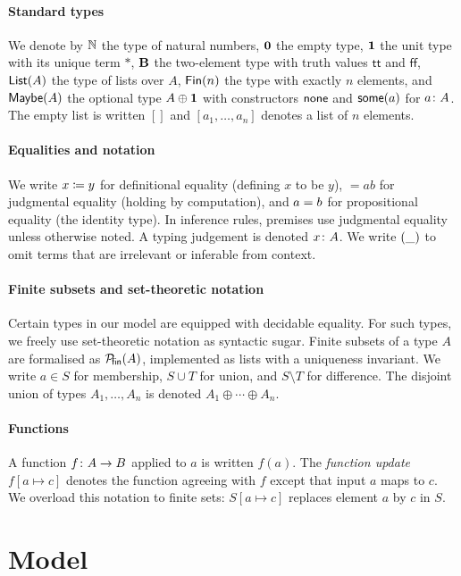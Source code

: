 \documentclass[
  a4paper,        %
  techreport,     %
]{art}
\begin{document}
\paragraph{Standard types}
We denote by $\mathbb{N}$ the type of natural numbers, $\mathbf{0}$ the empty type,
$\mathbf{1}$ the unit type with its unique term $*$, $\mathbf{B}$ the two-element type
with truth values $\mathsf{tt}$ and $\mathsf{ff}$, $\mathsf{List}(A)$ the type of lists
over $A$, $\mathsf{Fin}(n)$ the type with exactly $n$ elements, and $\mathsf{Maybe}(A)$ the
optional type $A \oplus \mathbf{1}$ with constructors $\mathsf{none}$ and $\mathsf{some}(a)$ for
$a\colon A$. The empty list is written $[]$ and $[a_1, \dots, a_n]$ denotes
a list of $n$ elements.

\paragraph{Equalities and notation}
We write $x \coloneqq y$ for definitional equality (defining $x$ to be
$y$), $\equal{a}{b}$ for judgmental equality (holding by computation), and
$a = b$ for propositional equality (the identity type). In inference
rules, premises use judgmental equality unless otherwise noted. A typing
judgement is denoted $x\colon A$. We write $(\_)$ to omit terms that
are irrelevant or inferable from context.

\paragraph{Finite subsets and set-theoretic notation}
Certain types in our model are equipped with decidable equality. For such types,
we freely use set-theoretic notation as syntactic sugar. Finite subsets of a
type $A$ are formalised as $\mathcal{P}_{\!\mathsf{fin}}(A)$, implemented as lists with a uniqueness
invariant. We write $a \in S$ for membership, $S \cup T$ for union, and
$S \setminus T$ for difference. The disjoint union of types $A_1, \dots, A_n$
is denoted $A_1 \oplus \cdots \oplus A_n$.

\paragraph{Functions}
A function $f\colon A \to B$ applied to $a$ is written $f(a)$.
The \emph{function update} $f[a \mapsto c]$ denotes the function agreeing with
$f$ except that input $a$ maps to $c$. We overload this notation to finite
sets: $S[a \mapsto c]$ replaces element $a$ by $c$ in $S$.

\section{Model}\label{sec:model}
\end{document}
